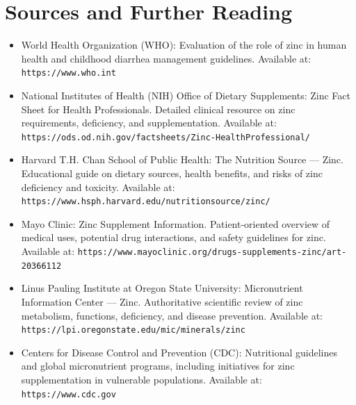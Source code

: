 \section*{Sources and Further Reading}
\begin{itemize}
    \item World Health Organization (WHO): Evaluation of the role of zinc in human health and childhood diarrhea management guidelines. Available at: \texttt{https://www.who.int}
    \item National Institutes of Health (NIH) Office of Dietary Supplements: Zinc Fact Sheet for Health Professionals. Detailed clinical resource on zinc requirements, deficiency, and supplementation. Available at: \texttt{https://ods.od.nih.gov/factsheets/Zinc-HealthProfessional/}
    \item Harvard T.H. Chan School of Public Health: The Nutrition Source --- Zinc. Educational guide on dietary sources, health benefits, and risks of zinc deficiency and toxicity. Available at: \texttt{https://www.hsph.harvard.edu/nutritionsource/zinc/}
    \item Mayo Clinic: Zinc Supplement Information. Patient-oriented overview of medical uses, potential drug interactions, and safety guidelines for zinc. Available at: \texttt{https://www.mayoclinic.org/drugs-supplements-zinc/art-20366112}
    \item Linus Pauling Institute at Oregon State University: Micronutrient Information Center --- Zinc. Authoritative scientific review of zinc metabolism, functions, deficiency, and disease prevention. Available at: \texttt{https://lpi.oregonstate.edu/mic/minerals/zinc}
    \item Centers for Disease Control and Prevention (CDC): Nutritional guidelines and global micronutrient programs, including initiatives for zinc supplementation in vulnerable populations. Available at: \texttt{https://www.cdc.gov}
\end{itemize}